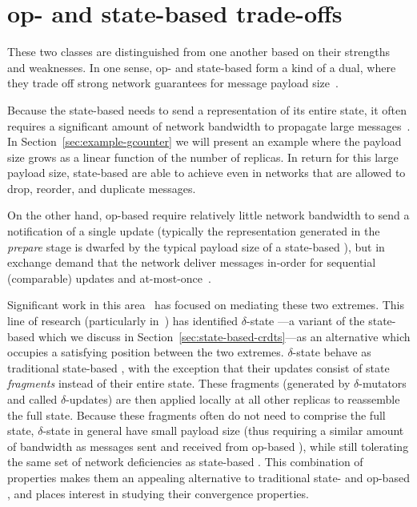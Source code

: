 \section{op- and state-based trade-offs}

These two classes are distinguished from one another based on their strengths
and weaknesses. In one sense, op- and state-based \CRDTs form a kind of a dual,
where they trade off strong network guarantees for message payload
size~\citep{baquero14}.

Because the state-based \CRDT needs to send a representation of its entire
state, it often requires a significant amount of network bandwidth to propagate
large messages~\citep{almedia18}. In Section~\ref{sec:example-gcounter} we will
present an example where the payload size grows as a linear function of the
number of replicas. In return for this large payload size, state-based \CRDTs
are able to achieve \SEC even in networks that are allowed to drop, reorder, and
duplicate messages.

On the other hand, op-based \CRDTs require relatively little network bandwidth
to send a notification of a single update (typically the representation
generated in the \textit{prepare} stage is dwarfed by the typical payload size
of a state-based \CRDT), but in exchange demand that the network deliver
messages in-order for sequential (comparable) updates and
at-most-once~\citep{shapiro11}.

Significant work in this area~\cite{almedia18, enes18, cabrita17, vanDerLinde16}
has focused on mediating these two extremes. This line of research (particularly
in~\citet{almedia18}) has identified $\delta$-state \CRDTs---a variant of the
state-based \CRDT which we discuss in Section~\ref{sec:state-based-crdts}---as
an alternative which occupies a satisfying position between the two extremes.
$\delta$-state \CRDTs behave as traditional state-based \CRDTs, with the
exception that their updates consist of state \emph{fragments} instead of their
entire state. These fragments (generated by $\delta$-mutators and called
$\delta$-updates) are then applied locally at all other replicas to reassemble
the full state. Because these fragments often do not need to comprise the full
state, $\delta$-state \CRDTs in general have small payload size (thus requiring
a similar amount of bandwidth as messages sent and received from op-based
\CRDTs), while still tolerating the same set of network deficiencies as
state-based \CRDTs. This combination of properties makes them an appealing
alternative to traditional state- and op-based \CRDTs, and places interest in
studying their convergence properties.

